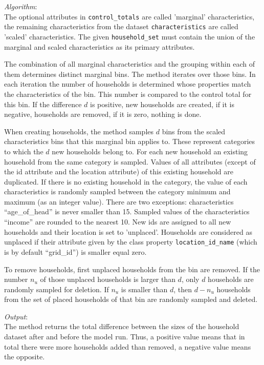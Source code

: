 {\it Algorithm}:~\\[1mm]
The optional attributes in \verb|control_totals| are called 'marginal'
characteristics, the remaining characteristics from the dataset \datasetindex
\verb|characteristics| are called 'scaled' characteristics. The given
\verb|household_set| must contain the union of the marginal and scaled
characteristics as its primary attributes. \primaryattributesindex

The combination of all marginal characteristics and the grouping within each
of them determines distinct marginal bins.  The method iterates over those
bins. In each iteration the number of households is determined whose
properties match the characteristics of the bin. This number is compared to
the control total for this bin. If the difference $d$ is positive, new
households are created, if it is negative, households are removed, if it is
zero, nothing is done.

When creating households, the method samples $d$ bins from the scaled
characteristics bins that this marginal bin applies to. These represent
categories to which the $d$ new households belong to. For each new household 
an existing household from the same category is sampled. Values of all attributes 
(except of the id attribute and the location attribute)
of this existing household are duplicated. If there is no existing household 
in the category,
the value of each characteristics is randomly sampled between the category
minimum and maximum (as an integer value). There are two exceptions:
characteristics ``age_of_head'' is never smaller than 15. Sampled values of
the characteristics ``income'' are rounded to the nearest 10. New ids are assigned 
to all new households and their location is set to 'unplaced'.  
Households are considered as unplaced if their
attribute \attributesindex given by the class property \verb|location_id_name| (which is by
default ``grid_id'') is smaller equal zero.

To remove households, first unplaced households from the bin are removed. If
the number $n_u$ of those unplaced households is larger than $d$, only $d$
households are randomly sampled for deletion. If $n_u$ is smaller than $d$,
then $d-n_u$ households from the set of placed households of that bin are
randomly sampled and deleted. 

{\it Output}:~\\[1mm]
The method returns the total difference between the sizes of the household
dataset \datasetindex after and before the model \modelsindex run. Thus, a positive value means that in
total there were more households added than removed, a negative value means
the opposite.

